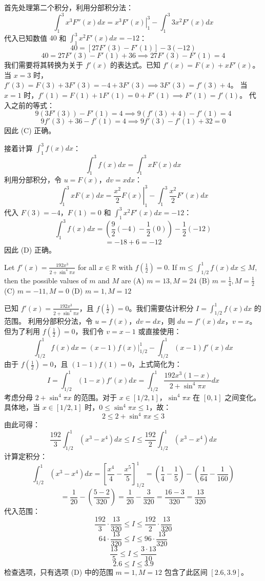 \begin{questions}
\begin{solution}
首先处理第二个积分，利用分部积分法：
\[
\int_1^3 x^3 F''(x) dx = \left. x^3 F'(x) \right|_1^3 - \int_1^3 3x^2 F'(x) dx
\]
代入已知数值 $40$ 和 $\int_1^3 x^2 F'(x) dx = -12$：
\[
40 = [27F'(3) - F'(1)] - 3(-12)
\]
\[
40 = 27F'(3) - F'(1) + 36 \implies 27F'(3) - F'(1) = 4
\]
我们需要将其转换为关于 $f'(x)$ 的表达式。已知 $f'(x) = F(x) + xF'(x)$。
当 $x = 3$ 时，$f'(3) = F(3) + 3F'(3) = -4 + 3F'(3) \implies 3F'(3) = f'(3) + 4$。
当 $x = 1$ 时，$f'(1) = F(1) + 1F'(1) = 0 + F'(1) \implies F'(1) = f'(1)$。
代入之前的等式：
\[
9(3F'(3)) - F'(1) = 4 \implies 9(f'(3) + 4) - f'(1) = 4
\]
\[
9f'(3) + 36 - f'(1) = 4 \implies 9f'(3) - f'(1) + 32 = 0
\]
因此 (C) 正确。

接着计算 $\int_1^3 f(x) dx$：
\[
\int_1^3 f(x) dx = \int_1^3 xF(x) dx
\]
利用分部积分，令 $u = F(x)$，$dv = x dx$：
\[
\int_1^3 xF(x) dx = \left. \frac{x^2}{2} F(x) \right|_1^3 - \int_1^3 \frac{x^2}{2} F'(x) dx
\]
代入 $F(3) = -4$，$F(1) = 0$ 和 $\int_1^3 x^2 F'(x) dx = -12$：
\[
\int_1^3 f(x) dx = \left( \frac{9}{2}(-4) - \frac{1}{2}(0) \right) - \frac{1}{2}(-12)
\]
\[
= -18 + 6 = -12
\]
因此 (D) 正确。
\end{solution}

\question Let $f'(x) = \frac{192x^3}{2 + \sin^4 \pi x}$ for all $x \in \mathbb{R}$ with $f\left(\frac{1}{2}\right) = 0$. If $m \leq \int_{1/2}^1 f(x) dx \leq M$, then the possible values of $m$ and $M$ are
(A) $m = 13, M = 24$
(B) $m = \frac{1}{4}, M = \frac{1}{2}$
(C) $m = -11, M = 0$
(D) $m = 1, M = 12$

\begin{solution}
已知 $f'(x) = \frac{192x^3}{2 + \sin^4 \pi x}$，且 $f\left(\frac{1}{2}\right) = 0$。我们需要估计积分 $I = \int_{1/2}^1 f(x) dx$ 的范围。
利用分部积分法，令 $u = f(x)$，$dv = dx$，则 $du = f'(x) dx$，$v = x$。但为了利用 $f\left(\frac{1}{2}\right) = 0$，我们令 $v = x - 1$ 或直接使用：
\[
\int_{1/2}^1 f(x) dx = \left. (x-1)f(x) \right|_{1/2}^1 - \int_{1/2}^1 (x-1)f'(x) dx
\]
由于 $f\left(\frac{1}{2}\right) = 0$，且 $(1-1)f(1) = 0$，上式简化为：
\[
I = \int_{1/2}^1 (1-x)f'(x) dx = \int_{1/2}^1 \frac{192x^3(1-x)}{2 + \sin^4 \pi x} dx
\]
考虑分母 $2 + \sin^4 \pi x$ 的范围。对于 $x \in [1/2, 1]$，$\sin^4 \pi x$ 在 $[0, 1]$ 之间变化。
具体地，当 $x \in [1/2, 1]$ 时，$0 \leq \sin^4 \pi x \leq 1$，故：
\[
2 \leq 2 + \sin^4 \pi x \leq 3
\]
由此可得：
\[
\frac{192}{3} \int_{1/2}^1 (x^3 - x^4) dx \leq I \leq \frac{192}{2} \int_{1/2}^1 (x^3 - x^4) dx
\]
计算定积分：
\[
\int_{1/2}^1 (x^3 - x^4) dx = \left[ \frac{x^4}{4} - \frac{x^5}{5} \right]_{1/2}^1 = \left( \frac{1}{4} - \frac{1}{5} \right) - \left( \frac{1}{64} - \frac{1}{160} \right)
\]
\[
= \frac{1}{20} - \left( \frac{5 - 2}{320} \right) = \frac{1}{20} - \frac{3}{320} = \frac{16 - 3}{320} = \frac{13}{320}
\]
代入范围：
\[
\frac{192}{3} \cdot \frac{13}{320} \leq I \leq \frac{192}{2} \cdot \frac{13}{320}
\]
\[
64 \cdot \frac{13}{320} \leq I \leq 96 \cdot \frac{13}{320}
\]
\[
\frac{13}{5} \leq I \leq \frac{3 \cdot 13}{10}
\]
\[
2.6 \leq I \leq 3.9
\]
检查选项，只有选项 (D) 中的范围 $m=1, M=12$ 包含了此区间 $[2.6, 3.9]$。
\end{solution}


\end{questions}
